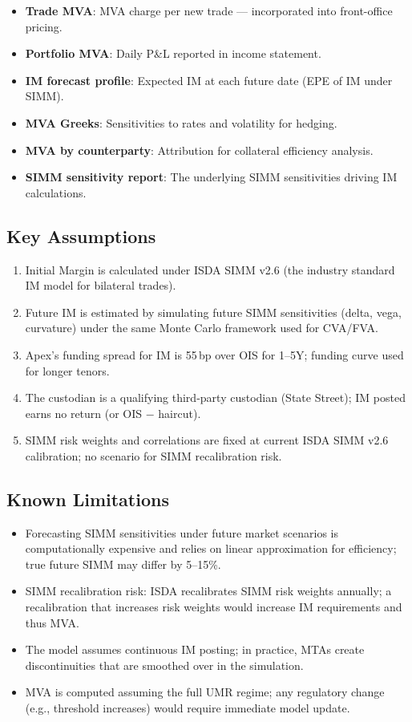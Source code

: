 \documentclass[11pt,a4paper]{article}
\begin{document}
\begin{itemize}[leftmargin=*]
  \item \textbf{Trade MVA}: MVA charge per new trade --- incorporated into front-office pricing.
  \item \textbf{Portfolio MVA}: Daily P\&L reported in income statement.
  \item \textbf{IM forecast profile}: Expected IM at each future date (EPE of IM under SIMM).
  \item \textbf{MVA Greeks}: Sensitivities to rates and volatility for hedging.
  \item \textbf{MVA by counterparty}: Attribution for collateral efficiency analysis.
  \item \textbf{SIMM sensitivity report}: The underlying SIMM sensitivities driving IM calculations.
\end{itemize}

\subsection{Key Assumptions}

\begin{enumerate}[leftmargin=*]
  \item Initial Margin is calculated under ISDA SIMM v2.6 (the industry standard IM model for bilateral trades).
  \item Future IM is estimated by simulating future SIMM sensitivities (delta, vega, curvature) under the same Monte Carlo framework used for CVA/FVA.
  \item Apex's funding spread for IM is 55\,bp over OIS for 1--5Y; funding curve used for longer tenors.
  \item The custodian is a qualifying third-party custodian (State Street); IM posted earns no return (or OIS $-$ haircut).
  \item SIMM risk weights and correlations are fixed at current ISDA SIMM v2.6 calibration; no scenario for SIMM recalibration risk.
\end{enumerate}

\subsection{Known Limitations}

\begin{itemize}[leftmargin=*]
  \item Forecasting SIMM sensitivities under future market scenarios is computationally expensive and relies on linear approximation for efficiency; true future SIMM may differ by 5--15\%.
  \item SIMM recalibration risk: ISDA recalibrates SIMM risk weights annually; a recalibration that increases risk weights would increase IM requirements and thus MVA.
  \item The model assumes continuous IM posting; in practice, MTAs create discontinuities that are smoothed over in the simulation.
  \item MVA is computed assuming the full UMR regime; any regulatory change (e.g., threshold increases) would require immediate model update.
\end{itemize}
\end{document}
